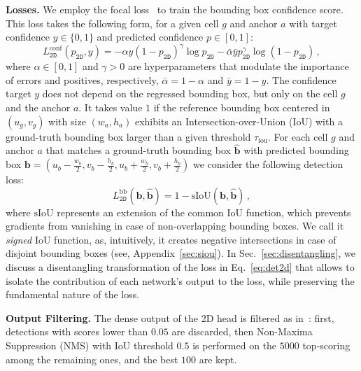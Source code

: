\documentclass[10pt,twocolumn,letterpaper]{article}
\newcommand{\vct}[1]{\ensuremath{\boldsymbol{#1}}}
\renewcommand{\paragraph}[1]{

        \vspace{3pt}
	\noindent\textbf{#1}}
\begin{document}
\paragraph{Losses.}
We employ the focal loss~\cite{Lin+17} to train the bounding box confidence score. This loss takes the following form, for a given cell $g$ and anchor $a$ with target confidence $y\in\{0,1\}$ and predicted confidence $p\in[0,1]$:
\[
L_\mathtt{2D}^\text{conf}(p_\mathtt{2D},y) = -\alpha y(1-p_\mathtt{2D})^\gamma \log p_\mathtt{2D} - \bar\alpha \bar y p_\mathtt{2D}^\gamma\log(1-p_\mathtt{2D})\,,
\]
where $\alpha\in[0,1]$ and $\gamma>0$ are hyperparameters that modulate the importance of errors and positives, respectively, $\bar \alpha=1-\alpha$ and $\bar y=1-y$.
The confidence target $y$ does not depend on the regressed bounding box, but only on the cell $g$ and the anchor $a$. It takes value $1$ if the reference bounding box centered in $(u_g,v_g)$ with size $(w_a,h_a)$ exhibits an Intersection-over-Union (IoU) with a ground-truth bounding box larger than a given threshold $\tau_\text{iou}$.
For each cell $g$ and anchor $a$ that matches a ground-truth bounding box $\vct{\hat b}$
with predicted bounding box $\vct b=(u_b-\frac{w_b}{2}, v_b-\frac{h_b}{2}, u_b+\frac{w_b}{2}, v_b+\frac{h_b}{2})$
we consider the following detection loss:
\begin{equation}\label{eq:det2d}
L_\mathtt{2D}^\text{bb}(\vct b, \vct {\hat b})=1-\text{sIoU}(\vct b,\vct{\hat b})\,,
\end{equation}
where $\text{sIoU}$ represents an extension of the common IoU function, which prevents gradients from vanishing in case of non-overlapping bounding boxes. 
We call it \emph{signed} IoU function, as, intuitively, it creates negative intersections in case of disjoint bounding boxes (see, Appendix~\ref{sec:siou}).
In Sec.~\ref{sec:disentangling}, we discuss a disentangling transformation of the loss in Eq.~\eqref{eq:det2d} that allows to isolate the contribution of each network's output to the loss, while preserving the fundamental nature of the loss.

\paragraph{Output Filtering.}
The dense output of the 2D head is filtered as in~\cite{Lin+17}: first, detections with scores lower than $0.05$ are discarded, then Non-Maxima Suppression (NMS) with IoU threshold $0.5$ is performed on the $5000$ top-scoring among the remaining ones, and the best $100$ are kept.
\end{document}

